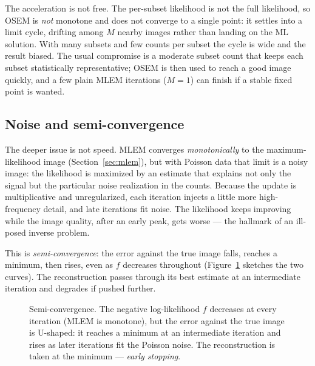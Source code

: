 The acceleration is not free. The per-subset likelihood is not the full
likelihood, so OSEM is \emph{not} monotone and does not converge to a single
point: it settles into a limit cycle, drifting among $M$ nearby images rather
than landing on the ML solution. With many subsets and few counts per subset the
cycle is wide and the result biased. The usual compromise is a moderate subset
count that keeps each subset statistically representative; OSEM is then used to
reach a good image quickly, and a few plain MLEM iterations ($M=1$) can finish if
a stable fixed point is wanted.

\subsection{Noise and semi-convergence}
\label{sec:acceleration:semiconv}

The deeper issue is not speed. MLEM converges \emph{monotonically} to the
maximum-likelihood image (Section~\ref{sec:mlem}), but with Poisson data that
limit is a noisy image: the likelihood is maximized by an estimate that explains
not only the signal but the particular noise realization in the counts. Because
the update is multiplicative and unregularized, each iteration injects a little
more high-frequency detail, and late iterations fit noise. The likelihood keeps
improving while the image quality, after an early peak, gets worse --- the hallmark
of an ill-posed inverse problem.

This is \emph{semi-convergence}: the error against the true image falls, reaches
a minimum, then rises, even as $f$ decreases throughout
(Figure~\ref{fig:acc-semiconv} sketches the two curves). The reconstruction
passes through its best estimate at an intermediate iteration and degrades if
pushed further.
\begin{figure}[t]
  \centering
  \caption{Semi-convergence. The negative log-likelihood $f$ decreases at every
    iteration (MLEM is monotone), but the error against the true image is
    U-shaped: it reaches a minimum at an intermediate iteration and rises as
    later iterations fit the Poisson noise. The reconstruction is taken at the
    minimum --- \emph{early stopping}.}
  \label{fig:acc-semiconv}
\end{figure}


